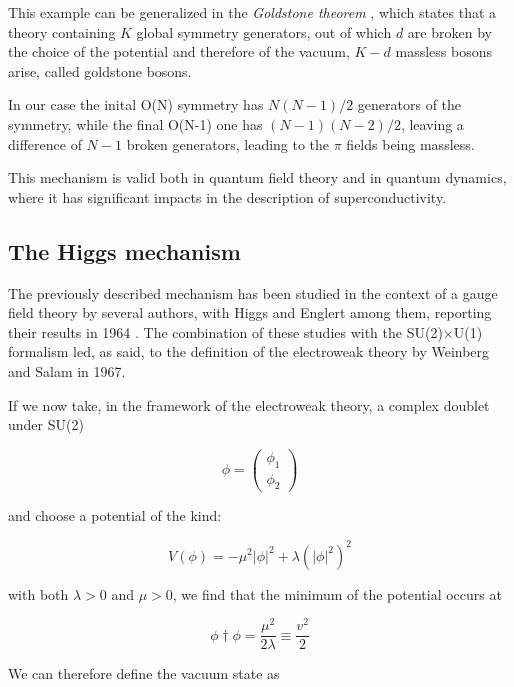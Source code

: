 This example can be generalized in the \emph{Goldstone theorem} \cite{1962PhRv..127..965G}, which states that a theory containing $K$ global symmetry generators, out of which $d$ are broken by the choice of the potential and therefore of the vacuum, $K - d$ massless bosons arise, called goldstone bosons. 

In our case the inital O(N) symmetry has $N(N-1)/2$ generators of the symmetry, while the final O(N-1) one has $(N-1)(N-2)/2$, leaving a difference of $N-1$ broken generators, leading to the $\pi$ fields being massless. 

This mechanism is valid both in quantum field theory and in quantum dynamics, where it has significant impacts in the description of superconductivity.

\subsection{The Higgs mechanism}

The previously described mechanism has been studied in the context of a gauge field theory by several authors, with Higgs and Englert among them, reporting their results in 1964 \cite{Englert:1964et, Higgs:1964ia}. The combination of these studies with the SU(2)$\times$U(1) formalism led, as said, to the definition of the electroweak theory by Weinberg and Salam in 1967.

If we now take, in the framework of the electroweak theory, a complex doublet under SU(2)

\begin{equation}
\phi = \left(\begin{array}{c}\phi_1 \\\phi_2\end{array}\right)
\end{equation}

and choose a potential of the kind:

\begin{equation}
V(\phi) = - \mu^2 |\phi|^2 + \lambda (|\phi|^2)^2
\end{equation}

with both $\lambda > 0$ and $\mu > 0$, we find that the minimum of the potential occurs at 

\begin{equation}
\phi\dag\phi = \dfrac{\mu^2}{2\lambda} \equiv \dfrac{v^2}{2}
\end{equation}

We can therefore define the vacuum state as

